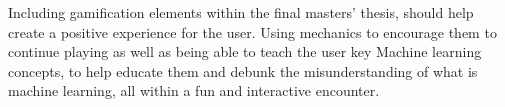 	Including gamification elements within the final masters' thesis, should help create a positive experience for the user. Using mechanics to encourage them to continue playing as well as being able to teach the user key Machine learning concepts, to help educate them and debunk the misunderstanding of what is machine learning, all within a fun and interactive encounter. 

%	
%	
%	
%	
%	
%		
	



